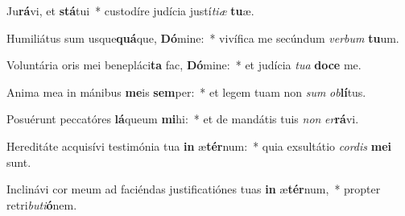 \item Ju\textbf{rá}vi, et \textbf{stá}tui~* custodíre judícia justí\textit{ti}\textit{æ} \textbf{tu}æ.
\item Humiliátus sum usque\textbf{quá}que, \textbf{Dó}mine:~* vivífica me secúndum \textit{ver}\textit{bum} \textbf{tu}um.
\item Voluntária oris mei benepláci\textbf{ta} fac, \textbf{Dó}mine:~* et judícia \textit{tu}\textit{a} \textbf{do}\textbf{ce} me.
\item Anima mea in mánibus \textbf{me}is \textbf{sem}per:~* et legem tuam non \textit{sum} \textit{ob}\textbf{lí}tus.
\item Posuérunt peccatóres \textbf{lá}queum \textbf{mi}hi:~* et de mandátis tuis \textit{non} \textit{er}\textbf{rá}vi.
\item Hereditáte acquisívi testimónia tua \textbf{in} æ\textbf{tér}num:~* quia exsultátio \textit{cor}\textit{dis} \textbf{me}\textbf{i} sunt.
\item Inclinávi cor meum ad faciéndas justificatiónes tuas \textbf{in} æ\textbf{tér}num,~* propter retri\textit{bu}\textit{ti}\textbf{ó}nem.
